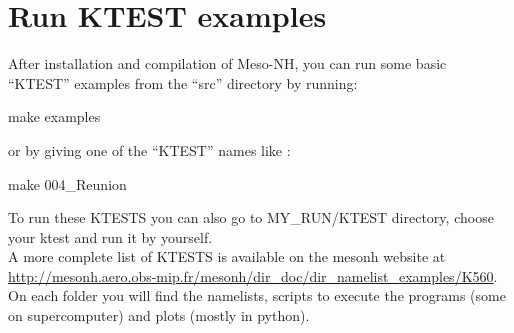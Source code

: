 \section{Run KTEST examples}
\label{sec:run_ktest_examples}

After installation and compilation of Meso-NH, you can run some basic ``KTEST'' examples from the ``src'' directory by running:
\begin{bashcode}
make examples 
\end{bashcode}

or by giving one of the ``KTEST'' names like :
\begin{bashcode}
make 004_Reunion
\end{bashcode}

To run these KTESTS you can also go to MY\_RUN/KTEST directory, choose your ktest and run it by yourself. \\

A more complete list of KTESTS is available on the mesonh website at \href{http://mesonh.aero.obs-mip.fr/mesonh/dir_doc/dir_namelist_examples/K560/}{http://mesonh.aero.obs-mip.fr/mesonh/dir\_doc/dir\_namelist\_examples/K560}.
On each folder you will find the namelists, scripts to execute the programs (some on supercomputer) and plots (mostly in python).

